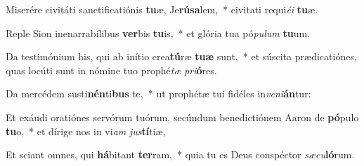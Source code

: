 \item Miserére civitáti sanctificatiónis \textbf{tu}æ, Je\textbf{rú}\textbf{sa}lem,~* civitati requi\textit{é}\textit{i} \textbf{tu}æ.
\item Reple Sion inenarrabílibus \textbf{ver}bis \textbf{tu}is,~* et glória tua pó\textit{pu}\textit{lum} \textbf{tu}um.
\item Da testimónium his, qui ab inítio crea\textbf{tú}ræ \textbf{tu}\textbf{æ} sunt,~* et súscita prædicatiónes, quas locúti sunt in nómine tuo prophé\textit{tæ} \textit{pri}\textbf{ó}res.
\item Da mercédem susti\textbf{nén}ti\textbf{bus} te,~* ut prophétæ tui fidéles in\textit{ve}\textit{ni}\textbf{án}tur:
\item Et exáudi oratiónes servórum tuórum, secúndum benedictiónem Aaron de \textbf{pó}pulo \textbf{tu}o,~* et dírige nos in vi\textit{am} \textit{jus}\textbf{tí}tiæ,
\item Et sciant omnes, qui \textbf{há}bitant \textbf{ter}ram,~* quia tu es Deus conspéctor \textit{sæ}\textit{cu}\textbf{ló}rum.
